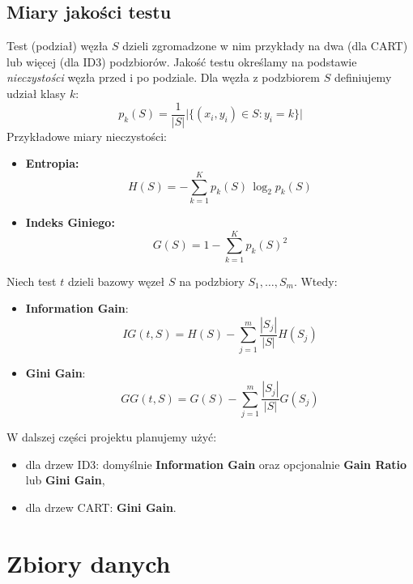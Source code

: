 \documentclass[a4paper]{article}
\begin{document}
\subsection{Miary jakości testu}

Test (podział) węzła $S$ dzieli zgromadzone w nim przykłady na dwa (dla CART) lub więcej (dla ID3) podzbiorów. Jakość testu określamy na podstawie \emph{nieczystości} węzła przed i po podziale.
Dla węzła z podzbiorem $S$ definiujemy udział klasy $k$:
\[
p_k(S) = \frac{1}{|S|} \bigl|\{(x_i, y_i) \in S : y_i = k\}\bigr|
\]
Przykładowe miary nieczystości:
\begin{itemize}
    \item \textbf{Entropia:}
    \[
        H(S) = - \sum_{k=1}^K p_k(S)\,\log_2 p_k(S)
    \]
    \item \textbf{Indeks Giniego:}
    \[
        G(S) = 1 - \sum_{k=1}^K p_k(S)^2
    \]
\end{itemize}
Niech test $t$ dzieli bazowy węzeł $S$ na podzbiory $S_1, \dots, S_m$. Wtedy:
\begin{itemize}
    \item \textbf{Information Gain}:
    \[
        IG(t, S) = H(S) - \sum_{j=1}^{m} \frac{|S_j|}{|S|} H(S_j)
    \]
    \item \textbf{Gini Gain}:
    \[
        GG(t, S) = G(S) - \sum_{j=1}^{m} \frac{|S_j|}{|S|} G(S_j)
    \]
\end{itemize}
W dalszej części projektu planujemy użyć:
\begin{itemize}
    \item dla drzew ID3: domyślnie \textbf{Information Gain} oraz opcjonalnie \textbf{Gain Ratio} lub \textbf{Gini Gain},
    \item dla drzew CART: \textbf{Gini Gain}.
\end{itemize}




\section{Zbiory danych}
\end{document}
